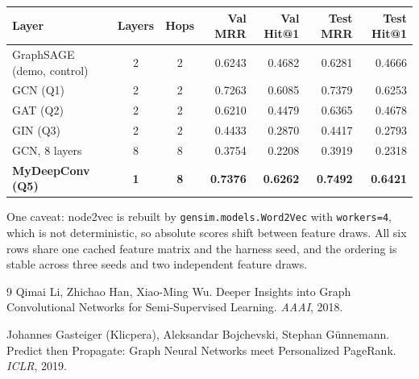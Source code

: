 \begin{table}[H]
  \centering
  \setlength{\tabcolsep}{4.5pt}%
  \begin{tabular}{lccrrrr}
    \toprule
    Layer & Layers & Hops & Val MRR & Val Hit@1 & Test MRR & Test Hit@1 \\
    \midrule
    GraphSAGE (demo, control) & 2 & 2 & 0.6243 & 0.4682 & 0.6281 & 0.4666 \\
    GCN (Q1)                  & 2 & 2 & 0.7263 & 0.6085 & 0.7379 & 0.6253 \\
    GAT (Q2)                  & 2 & 2 & 0.6210 & 0.4479 & 0.6365 & 0.4678 \\
    GIN (Q3)                  & 2 & 2 & 0.4433 & 0.2870 & 0.4417 & 0.2793 \\
    GCN, 8 layers             & 8 & 8 & 0.3754 & 0.2208 & 0.3919 & 0.2318 \\
    \textbf{MyDeepConv (Q5)}  & \textbf{1} & \textbf{8} & \textbf{0.7376} &
      \textbf{0.6262} & \textbf{0.7492} & \textbf{0.6421} \\
    \bottomrule
  \end{tabular}
  \label{p1:tab:results}
\end{table}

\noindent
One caveat: node2vec is rebuilt by \texttt{gensim.models.Word2Vec} with
\texttt{workers=4}, which is not deterministic, so absolute scores shift between feature
draws. All six rows share one cached feature matrix and the harness seed, and the
ordering is stable across three seeds and two independent feature draws.

\begin{thebibliography}{9}
Qimai Li, Zhichao Han, Xiao-Ming Wu.
\newblock Deeper Insights into Graph Convolutional Networks for Semi-Supervised
Learning.
\newblock \emph{AAAI}, 2018.

Johannes Gasteiger (Klicpera), Aleksandar Bojchevski, Stephan G\"unnemann.
\newblock Predict then Propagate: Graph Neural Networks meet Personalized PageRank.
\newblock \emph{ICLR}, 2019.
\end{thebibliography}
